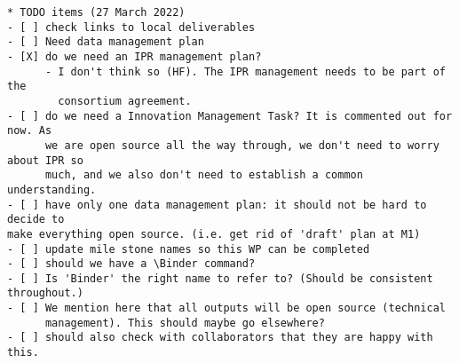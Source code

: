 \begin{draft}
\begin{verbatim}
* TODO items (27 March 2022)
- [ ] check links to local deliverables
- [ ] Need data management plan
- [X] do we need an IPR management plan?
      - I don't think so (HF). The IPR management needs to be part of the
        consortium agreement.
- [ ] do we need a Innovation Management Task? It is commented out for now. As
      we are open source all the way through, we don't need to worry about IPR so
      much, and we also don't need to establish a common understanding.
- [ ] have only one data management plan: it should not be hard to decide to
make everything open source. (i.e. get rid of 'draft' plan at M1)
- [ ] update mile stone names so this WP can be completed
- [ ] should we have a \Binder command?
- [ ] Is 'Binder' the right name to refer to? (Should be consistent throughout.)
- [ ] We mention here that all outputs will be open source (technical
      management). This should maybe go elsewhere?
- [ ] should also check with collaborators that they are happy with this.
\end{verbatim}
\end{draft}

